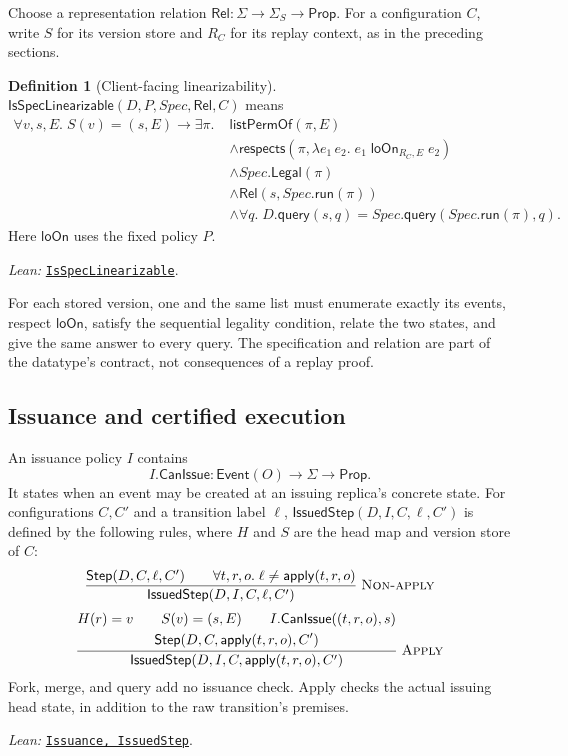 \documentclass[11pt]{article}
\theoremstyle{definition}
\newtheorem{definition}[theorem]{Definition}
\newcommand{\State}{\Sigma}
\newcommand{\Event}{\mathsf{Event}}
\newcommand{\query}{\mathsf{query}}
\newcommand{\loOn}{\mathsf{loOn}}
\newcommand{\src}[2]{\href{../../#1}{\texttt{#2}}}
\newcommand{\anchor}[2]{\par\smallskip\noindent\emph{Lean: }\src{#1}{#2}.}
\begin{document}
Choose a representation relation
$\mathsf{Rel}:\State\to\State_S\to\mathsf{Prop}$.
For a configuration $C$, write $S$ for its version store and $R_C$ for its
replay context, as in the preceding sections.

\begin{definition}[Client-facing linearizability]
$\mathsf{IsSpecLinearizable}(D,P,\mathit{Spec},\mathsf{Rel},C)$ means
\[
\begin{aligned}
 \forall v,s,E.\;S(v)=(s,E)\to\exists\pi.\;&
 \mathsf{listPermOf}(\pi,E)\\
 &\land\mathsf{respects}
   (\pi,\lambda e_1\,e_2.\;e_1\;\loOn_{R_C,E}\;e_2)\\
 &\land \mathit{Spec}.\mathsf{Legal}(\pi)\\
 &\land\mathsf{Rel}(s,\mathit{Spec}.\mathsf{run}(\pi))\\
 &\land\forall q.\;D.\query(s,q)=
   \mathit{Spec}.\query(\mathit{Spec}.\mathsf{run}(\pi),q).
\end{aligned}
\]
Here $\loOn$ uses the fixed policy $P$.
\anchor{Sal/MRDTs/Metatheory/Correctness.lean}{IsSpecLinearizable}
\end{definition}

For each stored version, one and the same list must enumerate exactly its
events, respect $\loOn$, satisfy the sequential legality condition, relate
the two states, and give the same answer to every query. The specification
and relation are part of the datatype's contract, not consequences of a
replay proof.

\subsection{Issuance and certified execution}

An issuance policy $I$ contains
\[
 I.\mathsf{CanIssue}:\Event(O)\to\State\to\mathsf{Prop}.
\]
It states when an event may be created at an issuing replica's concrete
state. For configurations $C,C'$ and a transition label $\ell$,
$\mathsf{IssuedStep}(D,I,C,\ell,C')$ is defined by the following rules,
where $H$ and $S$ are the head map and version store of $C$:
\[
\frac{
  \mathsf{Step}(D,C,\ell,C')\qquad
  \forall t,r,o.\;\ell\ne\mathsf{apply}(t,r,o)
}{
  \mathsf{IssuedStep}(D,I,C,\ell,C')
}\;\textsc{Non-apply}
\]
\[
\frac{
  \begin{gathered}
  H(r)=v\qquad S(v)=(s,E)\qquad
  I.\mathsf{CanIssue}((t,r,o),s)\\
  \mathsf{Step}(D,C,\mathsf{apply}(t,r,o),C')
  \end{gathered}
}{
  \mathsf{IssuedStep}(D,I,C,\mathsf{apply}(t,r,o),C')
}\;\textsc{Apply}
\]
Fork, merge, and query add no issuance check. Apply checks the actual
issuing head state, in addition to the raw transition's premises.
\anchor{Sal/MRDTs/Framework/Certificates.lean}{Issuance, IssuedStep}
\end{document}
